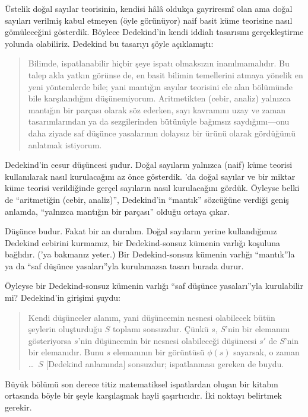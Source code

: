 Üstelik doğal sayılar teorisinin, kendisi hâlâ oldukça gayriresmî olan ama
doğal sayıları verilmiş kabul etmeyen (öyle görünüyor) naif basit küme
teorisine nasıl gömüleceğini gösterdik. Böylece Dedekind'in kendi iddialı
tasarısını gerçekleştirme yolunda olabiliriz. Dedekind bu tasarıyı şöyle
açıklamıştı:
\begin{quote}
	Bilimde, ispatlanabilir hiçbir şeye ispatı olmaksızın inanılmamalıdır.
	Bu talep akla yatkın görünse de, en basit bilimin temellerini atmaya
	yönelik en yeni yöntemlerde bile; yani mantığın sayılar teorisini ele
	alan bölümünde bile karşılandığını düşünemiyorum. Aritmetikten (cebir,
	analiz) yalnızca mantığın bir parçası olarak söz ederken, sayı kavramını
	uzay ve zaman tasarımlarından ya da sezgilerinden bütünüyle bağımsız
	saydığımı---onu daha ziyade saf düşünce yasalarının dolaysız bir ürünü
	olarak gördüğümü anlatmak istiyorum.
	\citep[preface]{Dedekind1888}
\end{quote}
Dedekind'in cesur düşüncesi şudur. Doğal sayıların yalnızca (naif) küme
teorisi kullanılarak nasıl kurulacağını az önce gösterdik.
'da doğal sayılar ve bir miktar küme teorisi
verildiğinde gerçel sayıların nasıl kurulacağını gördük. Öyleyse belki de
``aritmetiğin (cebir, analiz)'', Dedekind'in ``mantık'' sözcüğüne verdiği
geniş anlamda, ``yalnızca mantığın bir parçası'' olduğu ortaya çıkar.

Düşünce budur. Fakat bir an duralım. Doğal sayıların yerine kullandığımız
Dedekind cebirini kurmamız, bir Dedekind-sonsuz kümenin varlığı koşuluna
bağlıdır. ('ya
bakmanız yeter.) Bir Dedekind-sonsuz kümenin varlığı ``mantık''la ya da
``saf düşünce yasaları''yla kurulamazsa tasarı burada durur.

Öyleyse bir Dedekind-sonsuz kümenin varlığı ``saf düşünce yasaları''yla
kurulabilir mi? Dedekind'in girişimi şuydu:
\begin{quote}
  Kendi düşünceler alanım, yani düşüncemin nesnesi olabilecek bütün şeylerin
  oluşturduğu $S$ toplamı sonsuzdur. Çünkü $s$, $S$'nin bir elemanını
  gösteriyorsa $s$'nin düşüncemin bir nesnesi olabileceği düşüncesi $s'$ de
  $S$'nin bir elemanıdır. Bunu $s$ elemanının bir görüntüsü $\phi(s)$
  sayarsak, o zaman \dots~$S$ [Dedekind anlamında] sonsuzdur; ispatlanması
  gereken de buydu.
	\citep[\S66]{Dedekind1888}
\end{quote}
Büyük bölümü son derece titiz matematiksel ispatlardan oluşan bir kitabın
ortasında böyle bir şeyle karşılaşmak hayli şaşırtıcıdır. İki noktayı
belirtmek gerekir.

